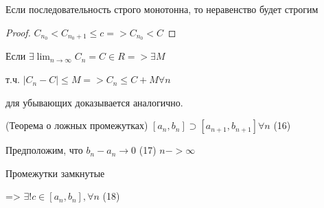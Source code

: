 Если последовательность строго монотонна, то неравенство будет строгим


\begin{proof}
    $C_{n_0} < C_{n_0 + 1} \leq c => C_{n_0} < C$

\end{proof}

Если $\exists \lim_{n \to \infty} C_n = C \in R => \exists M$

т.ч. $|C_n - C| \leq M => C_n \leq C + M \forall n$

для убывающих доказывается аналогично.

\begin{theorem} (Теорема о ложных промежутках)
    $[a_n, b_n] \supset [a_{n + 1}, b_{n + 1}] \forall n$ (16)
\end{theorem}

Предположим, что 
$b_n - a_n \to 0$ (17)
$n -> \infty$

Промежутки замкнутые

=> $\exists! c \in [a_n, b_n], \forall n$ (18)

